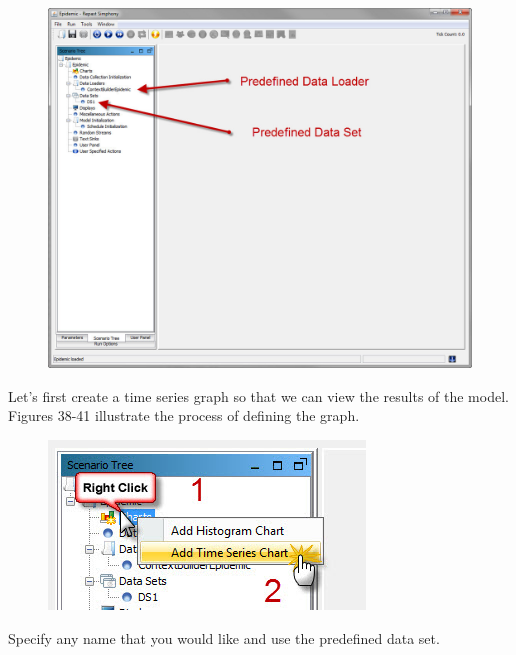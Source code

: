 \documentclass[11pt]{amsart}
\begin{document}
\begin{figure}[ht]
\begin{center}
\vspace{.2in}
\centerline {
\includegraphics[totalheight=0.3\textheight]{images/035.jpg}
}
\caption{}
\label{fig:035}
\end{center}
\end{figure}

Let’s first create a time series graph so that we can view the results of the model. Figures 38-41 illustrate the process of defining the graph.


\begin{figure}[ht]
\begin{center}
\vspace{.2in}
\centerline {
\includegraphics[totalheight=0.3\textheight]{images/036.jpg}
}
\caption{}
\label{fig:036}
\end{center}
\end{figure}

Specify any name that you would like and use the predefined data set.
\end{document}

